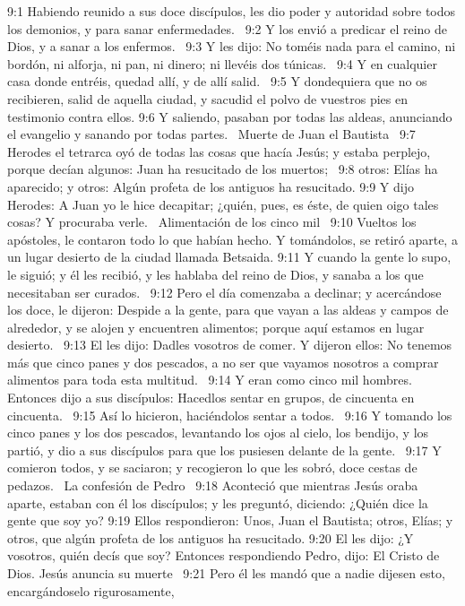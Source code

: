 9:1 Habiendo reunido a sus doce discípulos, les dio poder y autoridad sobre todos los demonios, y para sanar enfermedades.  
9:2 Y los envió a predicar el reino de Dios, y a sanar a los enfermos.  
9:3 Y les dijo: No toméis nada para el camino, ni bordón, ni alforja, ni pan, ni dinero; ni llevéis dos túnicas.  
9:4 Y en cualquier casa donde entréis, quedad allí, y de allí salid.  
9:5 Y dondequiera que no os recibieren, salid de aquella ciudad, y sacudid el polvo de vuestros pies en testimonio contra ellos. 
9:6 Y saliendo, pasaban por todas las aldeas, anunciando el evangelio y sanando por todas partes.  
Muerte de Juan el Bautista   
9:7 Herodes el tetrarca oyó de todas las cosas que hacía Jesús; y estaba perplejo, porque decían algunos: Juan ha resucitado de los muertos;  
9:8 otros: Elías ha aparecido; y otros: Algún profeta de los antiguos ha resucitado. 
9:9 Y dijo Herodes: A Juan yo le hice decapitar; ¿quién, pues, es éste, de quien oigo tales cosas? Y procuraba verle.  
Alimentación de los cinco mil  
9:10 Vueltos los apóstoles, le contaron todo lo que habían hecho. Y tomándolos, se retiró aparte, a un lugar desierto de la ciudad llamada Betsaida. 
9:11 Y cuando la gente lo supo, le siguió; y él les recibió, y les hablaba del reino de Dios, y sanaba a los que necesitaban ser curados.  
9:12 Pero el día comenzaba a declinar; y acercándose los doce, le dijeron: Despide a la gente, para que vayan a las aldeas y campos de alrededor, y se alojen y encuentren alimentos; porque aquí estamos en lugar desierto.  
9:13 El les dijo: Dadles vosotros de comer. Y dijeron ellos: No tenemos más que cinco panes y dos pescados, a no ser que vayamos nosotros a comprar alimentos para toda esta multitud.  
9:14 Y eran como cinco mil hombres. Entonces dijo a sus discípulos: Hacedlos sentar en grupos, de cincuenta en cincuenta.  
9:15 Así lo hicieron, haciéndolos sentar a todos.  
9:16 Y tomando los cinco panes y los dos pescados, levantando los ojos al cielo, los bendijo, y los partió, y dio a sus discípulos para que los pusiesen delante de la gente.  
9:17 Y comieron todos, y se saciaron; y recogieron lo que les sobró, doce cestas de pedazos.  
La confesión de Pedro   
9:18 Aconteció que mientras Jesús oraba aparte, estaban con él los discípulos; y les preguntó, diciendo: ¿Quién dice la gente que soy yo? 
9:19 Ellos respondieron: Unos, Juan el Bautista; otros, Elías; y otros, que algún profeta de los antiguos ha resucitado. 
9:20 El les dijo: ¿Y vosotros, quién decís que soy? Entonces respondiendo Pedro, dijo: El Cristo de Dios. 
Jesús anuncia su muerte   
9:21 Pero él les mandó que a nadie dijesen esto, encargándoselo rigurosamente,  
